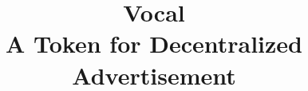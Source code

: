 \documentclass[conference]{IEEEtran}
\begin{document}
    \title{Vocal\\ A Token for Decentralized Advertisement}
    
    
    \author{
    \and
    \and
    }
    
    
    
    
\end{document}
